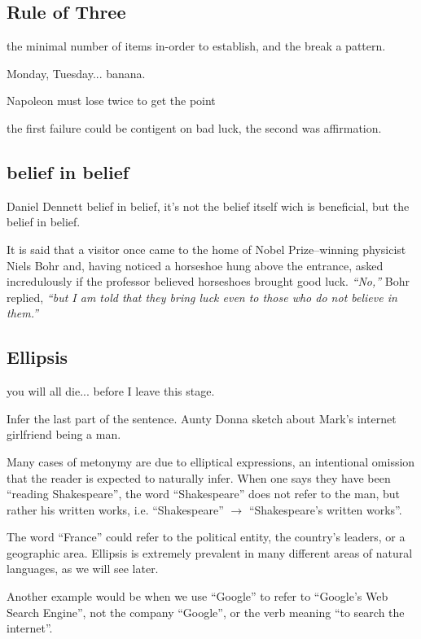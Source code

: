 \subsection{Rule of Three}

the minimal number of items in-order to establish, and the break a pattern.

Monday, Tuesday... banana.

Napoleon must lose twice to get the point

the first failure could be contigent on bad luck, the second was affirmation.

\subsection{belief in belief}
Daniel Dennett belief in belief, it's not the belief itself wich is beneficial, but the belief in belief.



It is said that a visitor once came to the home of Nobel Prize–winning physicist Niels Bohr and, having noticed a horseshoe hung above the entrance, asked incredulously if the professor believed horseshoes brought good luck. \textit{“No,”} Bohr replied, \textit{“but I am told that they bring luck even to those who do not believe in them.”}

\subsection*{Ellipsis}
you will all die... before I leave this stage.

Infer the last part of the sentence.
Aunty Donna sketch about Mark's internet girlfriend being a man.

Many cases of metonymy are due to elliptical expressions, an intentional omission that the reader is expected to naturally infer. When one says they have been ``reading Shakespeare'', the word ``Shakespeare'' does not refer to the man, but rather his written works, i.e. ``Shakespeare'' $\longrightarrow$ ``Shakespeare's written works''. 

The word ``France'' could refer to the political entity, the country's leaders, or a geographic area. Ellipsis is extremely prevalent in many different areas of natural languages, as we will see later.

Another example would be when we use ``Google'' to refer to ``Google's Web Search Engine'', not the company ``Google'', or the verb meaning ``to search the internet''.